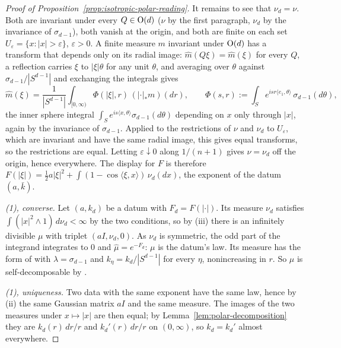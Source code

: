 \begin{proof}[Proof of Proposition~\ref{prop:isotropic-polar-reading}]
It remains to see that $\nu_d = \nu$. Both are invariant under every $Q \in \mathrm{O}(d)$ ($\nu$ by the
first paragraph, $\nu_d$ by the invariance of $\sigma_{d-1}$), both vanish at the origin, and both
are finite on each set $U_\varepsilon = \{x : |x| > \varepsilon\}$, $\varepsilon > 0$. A finite
measure $m$ invariant under $\mathrm{O}(d)$ has a transform that depends only on its radial image:
$\widehat m(Q\xi) = \widehat m(\xi)$ for every $Q$, a reflection carries $\xi$ to $|\xi|\theta$ for
any unit $\theta$, and averaging over $\theta$ against $\sigma_{d-1}/|S^{d-1}|$ and exchanging the
integrals gives
\[
  \widehat m(\xi) = \frac{1}{|S^{d-1}|}\int_{[0,\infty)}\Phi(|\xi|,r)\,(|\cdot|_*m)(dr) ,
  \qquad
  \Phi(s,r) := \int_S e^{i s r\langle e_1,\theta\rangle}\,\sigma_{d-1}(d\theta) ,
\]
the inner sphere integral $\int_S e^{i s\langle x,\theta\rangle}\sigma_{d-1}(d\theta)$ depending on
$x$ only through $|x|$, again by the invariance of $\sigma_{d-1}$. Applied to the restrictions of
$\nu$ and $\nu_d$ to $U_\varepsilon$, which are invariant and have the same radial image, this gives
equal transforms, so the restrictions are equal. Letting $\varepsilon \downarrow 0$ along
$1/(n+1)$ gives $\nu = \nu_d$ off the origin, hence everywhere. The display for $F$ is therefore
$F(|\xi|) = \tfrac12 a|\xi|^2 + \int(1 - \cos\langle\xi,x\rangle)\,\nu_d(dx)$, the exponent of the
datum $(a, \bar k)$.

\emph{(1), converse.} Let $(a,k_d)$ be a datum with $F_d = F(|\cdot|)$. Its \Levy{} measure
$\nu_d$ satisfies $\int(|x|^2 \wedge 1)\,d\nu_d < \infty$ by the two conditions, so by
(iii) there is an infinitely divisible $\mu$ with triplet $(aI, \nu_d, 0)$. As $\nu_d$
is symmetric, the odd part of the integrand integrates to $0$ and
$\widehat\mu = e^{-F_d}$: $\mu$ is the datum's law. Its \Levy{} measure has the form of
 with $\lambda = \sigma_{d-1}$ and $k_\eta = k_d/|S^{d-1}|$ for every $\eta$,
nonincreasing in $r$. So $\mu$ is self-decomposable by .

\emph{(1), uniqueness.} Two data with the same exponent have the same law, hence by (ii)
the same Gaussian matrix $aI$ and the same \Levy{} measure. The images of the two \Levy{}
measures under $x \mapsto |x|$ are then equal; by Lemma~\ref{lem:polar-decomposition} they are
$k_d(r)\,dr/r$ and $k_d'(r)\,dr/r$ on $(0,\infty)$, so $k_d = k_d'$ almost everywhere.


\end{proof}
